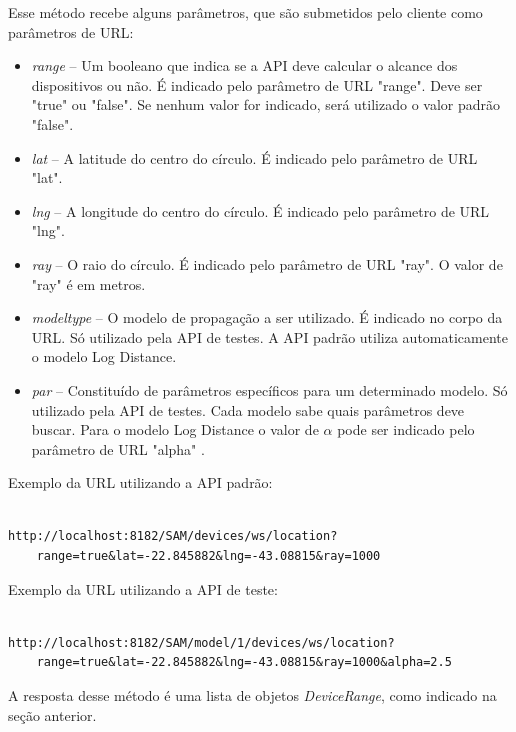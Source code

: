 Esse método recebe alguns parâmetros, que são submetidos pelo cliente como parâmetros de URL:

\begin{itemize}
\item \textit{range} -- Um booleano que indica se a API deve calcular o alcance dos dispositivos ou não. É indicado pelo parâmetro de URL "range". Deve ser "true" ou "false". Se nenhum valor for indicado, será utilizado o valor padrão "false".
\item \textit{lat} -- A latitude do centro do círculo. É indicado pelo parâmetro de URL "lat".
\item \textit{lng} -- A longitude do centro do círculo. É indicado pelo parâmetro de URL "lng".
\item \textit{ray} -- O raio do círculo. É indicado pelo parâmetro de URL "ray". O valor de "ray" é em metros.
\item \textit{modeltype} -- O modelo de propagação a ser utilizado. É indicado no corpo da URL. Só utilizado pela API de testes. A API padrão utiliza automaticamente o modelo Log Distance.
\item \textit{par} -- Constituído de parâmetros específicos para um determinado modelo. Só utilizado pela API de testes. Cada modelo sabe quais parâmetros deve buscar. Para o modelo Log Distance o valor de \begin{math} \alpha \end{math} pode ser indicado pelo parâmetro de URL "alpha" .
\end{itemize}


Exemplo da URL utilizando a API padrão:

\begin{lstlisting}	

http://localhost:8182/SAM/devices/ws/location?
	range=true&lat=-22.845882&lng=-43.08815&ray=1000

\end{lstlisting}

Exemplo da URL utilizando a API de teste:

\begin{lstlisting}			

http://localhost:8182/SAM/model/1/devices/ws/location?
	range=true&lat=-22.845882&lng=-43.08815&ray=1000&alpha=2.5

\end{lstlisting}


A resposta desse método é uma lista de objetos \textit{DeviceRange}, como indicado na seção anterior.


